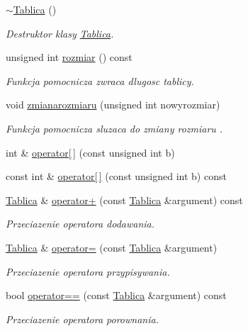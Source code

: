 \begin{DoxyCompactItemize}
\hyperlink{class_tablica_a6e1e50608ad0f9f9626d0b1fb698b180}{$\sim$\-Tablica} ()
\begin{DoxyCompactList}\small\item\em Destruktor klasy \hyperlink{class_tablica}{Tablica}. \end{DoxyCompactList}\item 
unsigned int \hyperlink{class_tablica_ae95a62ea4245e732b96c110c0fc53532}{rozmiar} () const 
\begin{DoxyCompactList}\small\item\em Funkcja pomocnicza zwraca dlugosc tablicy. \end{DoxyCompactList}\item 
void \hyperlink{class_tablica_a4e743bdbb74647717d63015894dfae8d}{zmianarozmiaru} (unsigned int nowyrozmiar)
\begin{DoxyCompactList}\small\item\em Funkcja pomocnicza sluzaca do zmiany rozmiaru . \end{DoxyCompactList}\item 
int \& \hyperlink{class_tablica_aa73e557bfd1a0283d94b594f159cf6d1}{operator\mbox{[}$\,$\mbox{]}} (const unsigned int b)
\item 
const int \& \hyperlink{class_tablica_a16a2591adbcce8add22be48ff8f1a830}{operator\mbox{[}$\,$\mbox{]}} (const unsigned int b) const 
\item 
\hyperlink{class_tablica}{Tablica} \& \hyperlink{class_tablica_a469a403559ecce37e70c8adc67a0fc0d}{operator+} (const \hyperlink{class_tablica}{Tablica} \&argument) const 
\begin{DoxyCompactList}\small\item\em Przeciazenie operatora dodawania. \end{DoxyCompactList}\item 
\hyperlink{class_tablica}{Tablica} \& \hyperlink{class_tablica_af42a963c962250d20240811a0defd6b4}{operator=} (const \hyperlink{class_tablica}{Tablica} \&argument)
\begin{DoxyCompactList}\small\item\em Przeciazenie operatora przypisywania. \end{DoxyCompactList}\item 
bool \hyperlink{class_tablica_a9416cdb689731ec64d440de10d944549}{operator==} (const \hyperlink{class_tablica}{Tablica} \&argument) const 
\begin{DoxyCompactList}\small\item\em Przeciazenie operatora porownania. \end{DoxyCompactList}\end{DoxyCompactItemize}
